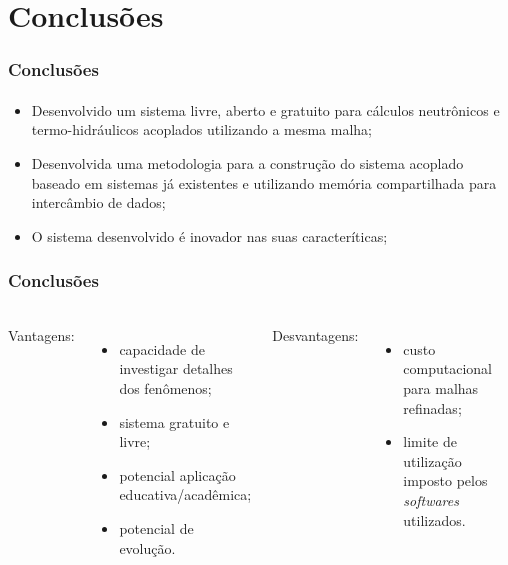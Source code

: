 \documentclass[svgnames,smaller,table]{beamer}
\begin{document}
\section{Conclusões}
\begin{frame}
  \frametitle{Conclusões}
  \framesubtitle{}
  \begin{itemize}
  \item Desenvolvido um sistema livre, aberto e gratuito para cálculos neutrônicos e termo-hidráulicos acoplados utilizando a mesma malha;
  \item Desenvolvida uma metodologia para a construção do sistema acoplado baseado em sistemas já existentes e utilizando memória compartilhada
    para intercâmbio de dados;
  \item O sistema desenvolvido é inovador nas suas caracteríticas;
  \end{itemize}
\end{frame}

\begin{frame}
  \frametitle{Conclusões}
  \framesubtitle{}
  \begin{columns}
    Vantagens:
    \\
    \begin{itemize}
    \item capacidade de investigar detalhes dos fenômenos;
    \item sistema gratuito e livre;
    \item potencial aplicação educativa/acadêmica;
    \item potencial de evolução.
    \end{itemize}
    \vspace{0.5cm}
    Desvantagens:
    \\
    \begin{itemize}
    \item custo computacional para malhas refinadas;
    \item limite de utilização imposto pelos \textit{softwares} utilizados.
    \end{itemize}
    \vspace{0.5cm}
  \end{columns}
\end{frame}
\end{document}
